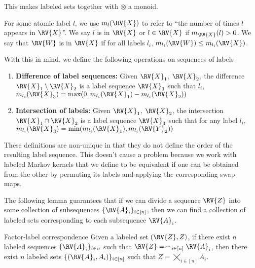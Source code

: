 This makes labeled sets together with $\otimes$ a monoid.

For some atomic label $l$, we use $m_{l}(\RV{X})$ to refer to ``the number of times $l$ appears in $\RV{X}$''. We say $l$ is in $\RV{X}$ or $l\in \RV{X}$ if $m_{\RV{X}}(l)>0$. We say that $\RV{W}$ is in $\RV{X}$ if for all labels $l_i$, $m_{l_i}(\RV{W})\leq m_{l_i}(\RV{X})$.

With this in mind, we define the following operations on sequences of labels

\begin{enumerate}
    \item \textbf{Difference of label sequences:} Given $\RV{X}_1$, $\RV{X}_2$, the difference $\RV{X}_1\setminus \RV{X}_2$ is a label sequence $\RV{X}_3$ such that $l_i$, $m_{l_i}(\RV{X}_3) = \max(0,m_{l_i}(\RV{X}_1)-m_{l_i}(\RV{X}_2))$
    \item \textbf{Intersection of labels:} Given $\RV{X}_1$, $\RV{X}_2$, the intersection $\RV{X}_1\cap \RV{X}_2$ is a label sequence $\RV{X}_3$ such that for any label $l_i$, $m_{l_i}(\RV{X}_3) = \min(m_{l_i}(\RV{X}_1),m_{l_i}(\RV{Y}_2))$
\end{enumerate}

These definitions are non-unique in that they do not define the order of the resulting label sequence. This doesn't cause a problem because we work with labeled Markov kernels that we define to be equivalent if one can be obtained from the other by permuting its labels and applying the corresponding swap maps.

The following lemma guarantees that if we can divide a sequence $\RV{Z}$ into some collection of subsequences $\{\RV{A}_i\}_{i\in [n]}$, then we can find a collection of labeled sets corresponding to each subsequence $\RV{A}_i$.

\begin{lemma}{Factor-label correspondence}\label{lem:fac-label}
Given a labeled set $(\RV{Z},Z)$, if there exist $n$ labeled sequences $\{\RV{A}_i\}_{i\in n}$ such that $\RV{Z}= \frown_{i\in [n]} \RV{A}_i$, then there exist $n$ labeled sets $\{(\RV{A}_i,A_i)\}_{i\in [n]}$ such that $Z=\bigtimes_{i\in[n]} A_i$.
\end{lemma}

